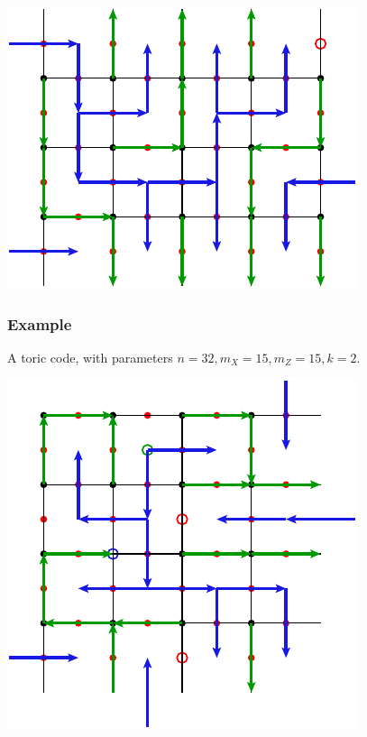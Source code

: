 \documentclass[11pt,oneside]{article}
\begin{document}
\begin{center}
\includegraphics[]{pic-surface.pdf}
\end{center}


\subsubsection{Example}

A toric code,
with parameters $n=32, m_X=15, m_Z=15, k=2.$

\begin{center}
\includegraphics[]{pic-torus.pdf}
\end{center}







{}

\end{document}

